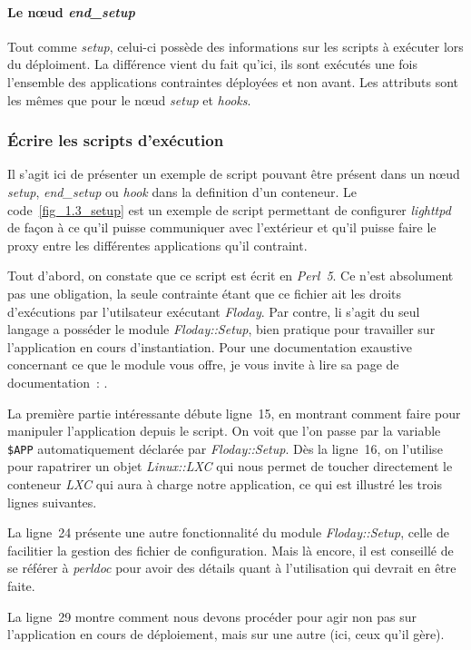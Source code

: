 \paragraph{Le nœud \emph{end\_setup}}
Tout comme \emph{setup}, celui-ci possède des informations sur les scripts à exécuter lors du déploiment.
La différence vient du fait qu'ici, ils sont exécutés une fois l'ensemble des applications contraintes déployées et non avant.
Les attributs sont les mêmes que pour le nœud \emph{setup} et \emph{hooks}.

\subsubsection{Écrire les scripts d'exécution}
Il s'agit ici de présenter un exemple de script pouvant être présent dans un nœud \emph{setup}, \emph{end\_setup} ou \emph{hook} dans la \gls{definition} d'un \gls{conteneur}.
Le code~\ref{fig_1.3_setup} est un exemple de script permettant de configurer \emph{lighttpd} de façon à ce qu'il puisse communiquer avec l'extérieur et qu'il puisse faire le proxy entre les différentes applications qu'il \gls{contraint}.



Tout d'abord, on constate que ce script est écrit en \emph{Perl~5}.
Ce n'est absolument pas une obligation, la seule contrainte étant que ce fichier ait les droits d'exécutions par l'utilsateur exécutant \emph{Floday}.
Par contre, li s'agit du seul langage a posséder le module \emph{Floday::Setup}, bien pratique pour travailler sur l'\gls{application} en cours d'instantiation.
Pour une documentation exaustive concernant ce que le module vous offre, je vous invite à lire sa page de documentation~:
.

La première partie intéressante débute ligne~15, en montrant comment faire pour manipuler l'application depuis le script.
On voit que l'on passe par la variable {\tt\$APP} automatiquement déclarée par \emph{Floday::Setup}.
Dès la ligne~16, on l'utilise pour rapatrirer un objet \emph{Linux::LXC} qui nous permet de toucher directement le conteneur \emph{LXC} qui aura à charge notre application, ce qui est illustré les trois lignes suivantes.

La ligne~24 présente une autre fonctionnalité du module \emph{Floday::Setup}, celle de facilitier la gestion des fichier de configuration.
Mais là encore, il est conseillé de se référer à \emph{perldoc} pour avoir des détails quant à l'utilisation qui devrait en être faite.

La ligne~29 montre comment nous devons procéder pour agir non pas sur l'application en cours de déploiement, mais sur une autre (ici, ceux qu'il gère).
